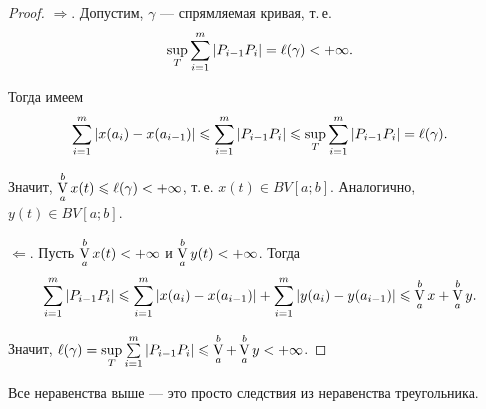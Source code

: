 \begin{proof}
    $\Rightarrow$. Допустим, $\gamma$ --- спрямляемая кривая, т.\,е.
    \[
        \sup_T\sum_{i = 1}^m\left\lvert P_{i - 1}P_i\right\rvert = \ell(\gamma) < +\infty.
    \]

    Тогда имеем
    \[
        \sum_{i = 1}^m\left\lvert x(a_i) - x(a_{i - 1})\right\rvert \leqslant \sum_{i = 1}^m\left\lvert P_{i - 1}P_i\right\rvert \leqslant \sup_T\sum_{i = 1}^m\left\lvert P_{i - 1}P_i\right\rvert = \ell(\gamma).
    \]

    Значит, $\operatorname*{V}\limits_a^bx(t) \leqslant \ell(\gamma) < +\infty$, т.\,е. $x(t) \in BV[a; b]$. Аналогично, $y(t) \in BV[a; b]$.

    $\Leftarrow$. Пусть $\operatorname*{V}\limits_a^bx(t) < +\infty$ и $\operatorname*{V}\limits_a^by(t) < +\infty$. Тогда 
    \[
        \sum_{i = 1}^m\left\lvert P_{i - 1}P_i\right\rvert \leqslant \sum_{i = 1}^m\left\lvert x(a_i) - x(a_{i - 1})\right\rvert + \sum_{i = 1}^m\left\lvert y(a_i) - y(a_{i - 1})\right\rvert \leqslant \operatorname*{V}_a^bx + \operatorname*{V}_a^by.
    \]

    Значит, $\ell(\gamma) = \sup\limits_T\sum\limits_{i = 1}^m\left\lvert P_{i - 1}P_i\right\rvert \leqslant \operatorname*{V}\limits_a^b + \operatorname*{V}\limits_a^by < +\infty$.
\end{proof}

\begin{remark}
    Все неравенства выше --- это просто следствия из неравенства треугольника.
\end{remark}

